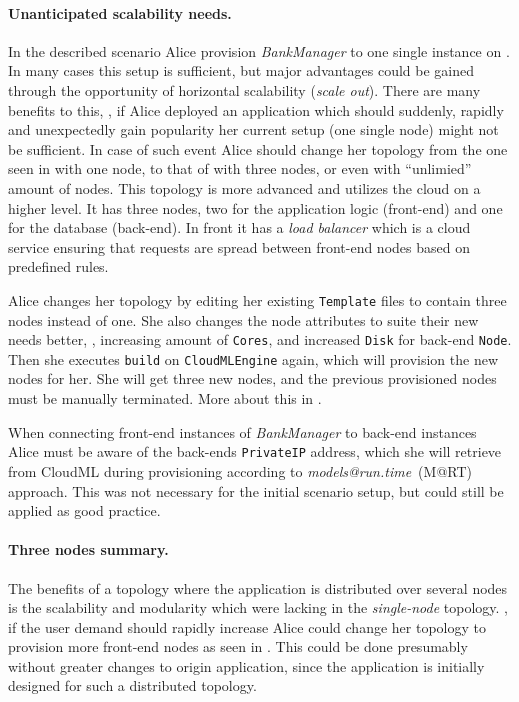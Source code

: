 \paragraph{Unanticipated scalability needs.}

In the described scenario Alice provision \emph{BankManager} to one single instance on .
In many cases this setup is sufficient, but major advantages
could be gained through the opportunity of horizontal scalability (\emph{scale out}).
There are many benefits to this, 
\eg, if Alice deployed an application which should suddenly, 
rapidly and unexpectedly gain popularity her current setup (one single node) might not be sufficient.
In case of such event Alice should change her topology from the one seen in 
 with one node, to that of  with three nodes,
or even  with ``unlimied'' amount of nodes.
This topology is more advanced and utilizes the cloud on a higher level.
It has three nodes, two for the application logic (front-end) and one for the database (back-end).
In front it has a \emph{load balancer} which is a cloud service ensuring that requests
are spread between front-end nodes based on predefined rules.

Alice changes her topology by editing her existing \texttt{Template} files 
to contain three nodes instead of one. 
She also changes the node attributes to suite their new needs better,
\ie, increasing amount of \texttt{Cores}, and increased \texttt{Disk} for back-end \texttt{Node}.
Then she executes \texttt{build} on \texttt{CloudMLEngine} again,
which will provision the new nodes for her.
She will get three new nodes, and the previous provisioned nodes must be manually terminated.
More about this in .

When connecting front-end instances of \emph{BankManager} to back-end instances Alice must 
be aware of the back-ends \texttt{PrivateIP} address, which she will retrieve from CloudML
during provisioning according to \emph{models@run.time}~(M@RT) approach.
This was not necessary for the initial scenario setup, but could still be applied
as good practice.

\paragraph{Three nodes summary.}


The benefits of a topology where the application is distributed over several nodes 
is the scalability and modularity which were lacking in the \emph{single-node} topology.
\eg, if the user demand should rapidly increase Alice could change her topology to
provision more front-end nodes as seen in .
This could be done presumably without greater changes to origin application,
since the application is initially designed for such a distributed topology.

